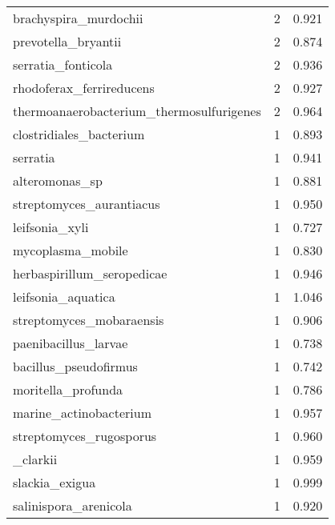 \begin{tabular}{lrr}
                       brachyspira\_murdochii &                   2 &     0.921 \\
                         prevotella\_bryantii &                   2 &     0.874 \\
                          serratia\_fonticola &                   2 &     0.936 \\
                    rhodoferax\_ferrireducens &                   2 &     0.927 \\
    thermoanaerobacterium\_thermosulfurigenes &                   2 &     0.964 \\
                     clostridiales\_bacterium &                   1 &     0.893 \\
                                    serratia &                   1 &     0.941 \\
                              alteromonas\_sp &                   1 &     0.881 \\
                    streptomyces\_aurantiacus &                   1 &     0.950 \\
                              leifsonia\_xyli &                   1 &     0.727 \\
                           mycoplasma\_mobile &                   1 &     0.830 \\
                  herbaspirillum\_seropedicae &                   1 &     0.946 \\
                          leifsonia\_aquatica &                   1 &     1.046 \\
                    streptomyces\_mobaraensis &                   1 &     0.906 \\
                        paenibacillus\_larvae &                   1 &     0.738 \\
                       bacillus\_pseudofirmus &                   1 &     0.742 \\
                          moritella\_profunda &                   1 &     0.786 \\
                      marine\_actinobacterium &                   1 &     0.957 \\
                     streptomyces\_rugosporus &                   1 &     0.960 \\
                          [bacillus]\_clarkii &                   1 &     0.959 \\
                              slackia\_exigua &                   1 &     0.999 \\
                       salinispora\_arenicola &                   1 &     0.920 \\

\end{tabular}
